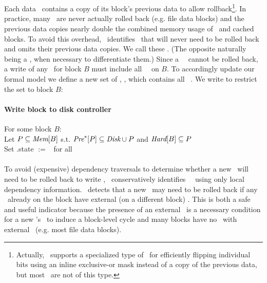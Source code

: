 \subsection{\Nrb\ \ChDescs}
\label{sec:chdescs:nrb}

Each data \chdesc\ contains a copy of its block's previous data to
allow rollback\footnote{Actually, \Kudos\ supports a specialized type of \chdesc\ for
efficiently flipping individual bits using an inline exclusive-or mask instead
of a copy of the previous data, but most \chdescs\ are not of this type.}.
%
In practice, many \chdesc\ are never actually rolled back (e.g. file
data blocks)
%
and the previous data copies nearly double the combined memory usage of
\chdescs\ and cached blocks.
%
To avoid this overhead, \Kudos\ identifies \chdescs\ that will never
need to be rolled back and omits their previous data copies. We call
these \emph{\nrb} \chdescs. (The opposite naturally being a \emph{\rb}
\chdesc, when necessary to differentiate them.)
%
Since a \nrb\ \chdesc\ cannot be rolled back, a write of any \chdescs\
for block $B$ must include all \nrb\ \chdescs\ on $B$. To accordingly
update our formal model we define a new set of \chdescs, \ChNrb, which
contains all \nrb\ \chdescs. We write \ChNrbB{B} to restrict the set
to block $B$:

\paragraph{Write block to disk controller}
For some block $B$: \\
Let \(P \subseteq \textit{Mem}[B]\) s.t.
\(\textit{Pre}^*[P] \subseteq \textit{Disk} \cup P\) and \(\textit{Hard}[B] \subseteq P\) \\
Set \p{p}.state $:=$ \stateinf\ for all \inset{p}{P}

\paragraph{}
To avoid (expensive) dependency traversals to determine whether a new
\chdesc\ will need to be rolled back to write \ChAll,
%
\Kudos\ conservatively identifies \nrb\ \chdescs\ using only local
dependency information.
%
\Kudos\ detects that a new \chdesc\ may need to be rolled back if any
\chdescs\ already on the block have external (on a different
block)
\afters.
%
This is both a safe and useful indicator because
%
the presence of an external \after\ is a necessary condition for a new
\chdesc's \before\ to induce a block-level cycle
%
and many blocks have no \chdescs\ with external \afters\ (e.g. most
file data blocks).

